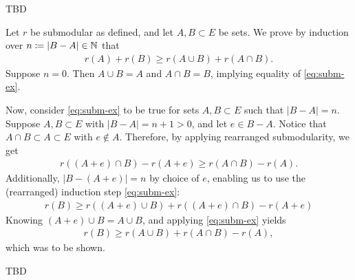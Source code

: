 \begin{aufgabe}
    TBD
\end{aufgabe}
\begin{aufgabe}
    Let $r$ be submodular as defined, and let $A,B \subset E$ be sets.
    We prove by induction over $n \coloneqq |B-A| \in \mathbb{N}$ that 
    \begin{align}
        \label{eq:subm-ex}
        r(A)+r(B) \geq r(A\cup B) + r(A \cap B).
    \end{align}
    Suppose $n = 0$. Then $A \cup B = A$ and $A \cap B = B$, implying equality of \eqref{eq:subm-ex}.

    Now, consider \eqref{eq:subm-ex} to be true for sets $A,B \subset E$ such that $|B-A|=n$.
    Suppose $A,B \subset E$ with $|B-A|=n+1>0$, and let $e \in B-A$. 
    Notice that $A \cap B \subset A \subset E$ with $e \not \in A$. 
    Therefore, by applying rearranged submodularity, we get
    \begin{align}
        \label{eq:subm-ex-e}
        r( (A+e) \cap B) - r(A + e) \geq r(A \cap B) - r(A).
    \end{align}
    Additionally, $|B - (A+e)|=n$ by choice of $e$, enabling us to use
    the (rearranged) induction step \eqref{eq:subm-ex}:
    \begin{align*}
        r(B) \geq r((A+e)\cup B) + r((A+e) \cap B) - r(A+e)
    \end{align*}
    Knowing $(A+e) \cup B = A \cup B$, and applying \eqref{eq:subm-ex} yields
    \begin{align*}
        r(B) \geq r(A \cup B) + r(A \cap B) - r(A),
    \end{align*}
    which was to be shown.
\end{aufgabe}
\begin{aufgabe}
    TBD
\end{aufgabe}
